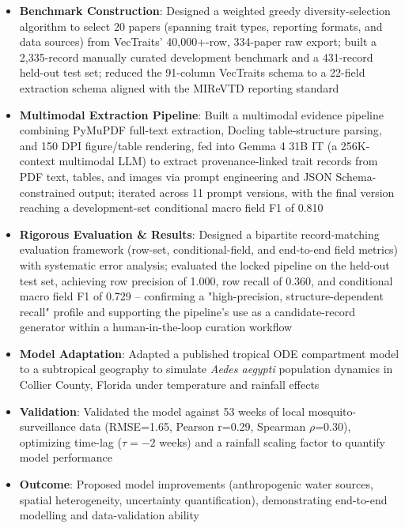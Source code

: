 \documentclass{my-resume}
\begin{document}
\begin{itemize}[parsep=0.2ex]
  \item \textbf{Benchmark Construction}: Designed a weighted greedy diversity-selection algorithm to select 20 papers (spanning trait types, reporting formats, and data sources) from VecTraits' 40,000+-row, 334-paper raw export; built a 2,335-record manually curated development benchmark and a 431-record held-out test set; reduced the 91-column VecTraits schema to a 22-field extraction schema aligned with the MIReVTD reporting standard
  \item \textbf{Multimodal Extraction Pipeline}: Built a multimodal evidence pipeline combining PyMuPDF full-text extraction, Docling table-structure parsing, and 150 DPI figure/table rendering, fed into Gemma 4 31B IT (a 256K-context multimodal LLM) to extract provenance-linked trait records from PDF text, tables, and images via prompt engineering and JSON Schema-constrained output; iterated across 11 prompt versions, with the final version reaching a development-set conditional macro field F1 of 0.810
  \item \textbf{Rigorous Evaluation \& Results}: Designed a bipartite record-matching evaluation framework (row-set, conditional-field, and end-to-end field metrics) with systematic error analysis; evaluated the locked pipeline on the held-out test set, achieving row precision of 1.000, row recall of 0.360, and conditional macro field F1 of 0.729 -- confirming a "high-precision, structure-dependent recall" profile and supporting the pipeline's use as a candidate-record generator within a human-in-the-loop curation workflow
\end{itemize}

\begin{itemize}[parsep=0.2ex]
  \item \textbf{Model Adaptation}: Adapted a published tropical ODE compartment model to a subtropical geography to simulate \textit{Aedes aegypti} population dynamics in Collier County, Florida under temperature and rainfall effects
  \item \textbf{Validation}: Validated the model against 53 weeks of local mosquito-surveillance data (RMSE=1.65, Pearson r=0.29, Spearman $\rho$=0.30), optimizing time-lag ($\tau=-2$ weeks) and a rainfall scaling factor to quantify model performance
  \item \textbf{Outcome}: Proposed model improvements (anthropogenic water sources, spatial heterogeneity, uncertainty quantification), demonstrating end-to-end modelling and data-validation ability
\end{itemize}
\end{document}
